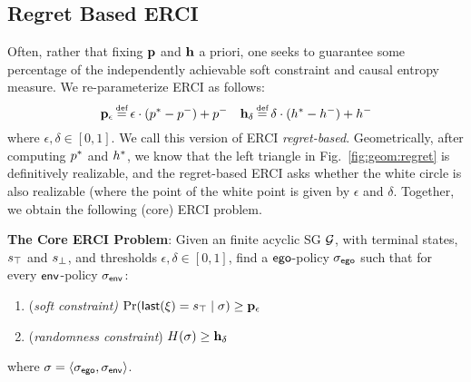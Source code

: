 \subsection{Regret Based ERCI}
Often, rather that fixing $\mathbf{p}$ and $\mathbf{h}$ a
  priori, one seeks to guarantee some percentage of the independently achievable soft
  constraint and causal entropy measure.  We
  re-parameterize ERCI as follows:
  \begin{equation}
    \scthreshold_\epsilon \eqdef \epsilon \cdot (\scopt - \scmin) + \scmin
    \hspace{1em}
    \randomness_\delta \eqdef  \delta \cdot (\rndopt - \rndmin) + \rndmin
  \end{equation}
  where $\epsilon, \delta \in [0, 1]$. We call this version of ERCI \emph{regret-based}. Geometrically, after computing $p^{*}$ and $h^{*}$, we know that the left triangle in Fig.~\ref{fig:geom:regret} is definitively realizable, and the regret-based ERCI asks whether the white circle is also realizable (where the point of the white point is given by $\epsilon$ and $\delta$. %
\noindent 
Together, we obtain the following (core) ERCI problem.
\begin{mdframed}[backgroundcolor=blue!5,nobreak=true]
\textbf{The Core ERCI Problem}:
Given an finite acyclic SG $\mathcal{G}$, with terminal states, $s_{\top}$ and $s_{\bot}$, and thresholds $\epsilon, \delta \in [0,1]$,  find a $\mathsf{ego}$-policy ${\sigma_{\mathsf{ego}}}$  such that for every $\mathsf{env}$-policy ${\sigma_{\mathsf{env}}}$:
\begin{enumerate}
\item (\emph{soft constraint)}
  $\Pr(\mathsf{last}({\xi}) = s_{\top} \mid \sigma) \geq \mathbf{p}_\epsilon$
\item (\emph{randomness constraint}) $H(\sigma) \geq \mathbf{h}_\delta$
\end{enumerate}
where  $\sigma = \langle {\sigma_{\mathsf{ego}}}, {\sigma_{\mathsf{env}}} \rangle$.
\end{mdframed}


